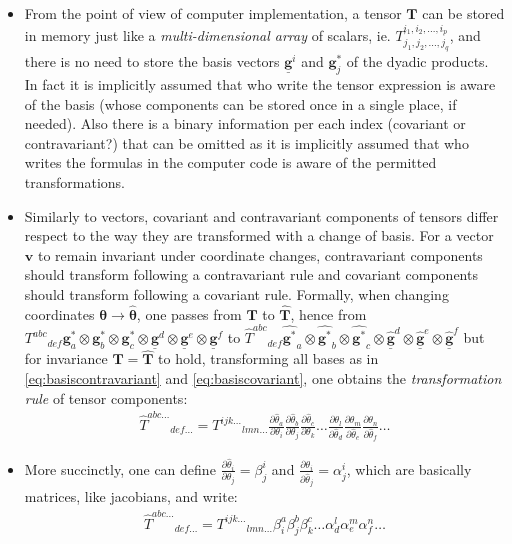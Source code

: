 \documentclass{digitaldynamics}
\def\vect#1{\bm{#1}}
\def\vcovar#1{{\bm{#1}}^*}
\def\vcontr#1{\underline{\bm{#1}}}
\def\tensor#1{\bm{#1}}
\begin{document}
\begin{itemize}
	
	\item From the point of view of computer implementation, a tensor $\tensor{T}$ can be stored in memory just like a \textit{multi-dimensional array} of
	scalars, ie. 	$T^{i_1, i_2, ..., i_p}_{j_1, j_2, ..., j_q}$, and there is no need to store the basis vectors $\vcontr{g}^i$ and $\vcovar{g}_j$ of the dyadic products. 
	In fact it is implicitly assumed that who write the tensor expression is aware of the basis (whose components can be stored once in a single place, if needed).
	Also there is a binary information per each index (covariant or contravariant?) that can be omitted as it is implicitly assumed that
	who writes the formulas in the computer code is aware of the permitted transformations.
 	
	\item Similarly to vectors, covariant and contravariant components of tensors differ respect to the way they are transformed with a change of basis.
	For a vector $\vect{v}$ to remain invariant under coordinate changes, contravariant components should transform following a 
	contravariant rule and covariant components should transform following a covariant rule. Formally, when changing coordinates $\vect{\theta} \rightarrow \hat{\vect{\theta}}$, one passes from $\tensor{T}$ to $\hat{\tensor{T}}$, hence from 
	$T^{abc}{}_{def} \vcovar{g}_a \otimes \vcovar{g}_b \otimes \vcovar{g}_c \otimes \vcontr{g}^d \otimes \vcontr{g}^e \otimes \vcontr{g}^f$ 
	to  
	$\hat{T}^{abc}{}_{def} \hat{\vcovar{g}}_a \otimes \hat{\vcovar{g}}_b \otimes \hat{\vcovar{g}}_c \otimes \hat{\vcontr{g}}^d \otimes \hat{\vcontr{g}}^e \otimes \hat{\vcontr{g}}^f$
	but for invariance $\tensor{T}=\hat{\tensor{T}}$ to hold, transforming all bases as in \eqref{eq:basiscontravariant} and \eqref{eq:basiscovariant}, one obtains the \textit{transformation rule} of tensor components:
	\begin{align}
  \hat{T}^{abc\ldots}{}_{def\ldots} = {T}^{ijk\ldots}{}_{lmn\ldots} 
			\frac{\partial \hat{\theta}_a}{\partial \theta_i}
			\frac{\partial \hat{\theta}_b}{\partial \theta_j}
			\frac{\partial \hat{\theta}_c}{\partial \theta_k}\ldots
			\frac{\partial \theta_l}{\partial \hat{\theta}_d}
			\frac{\partial \theta_m}{\partial \hat{\theta}_e}
			\frac{\partial \theta_n}{\partial \hat{\theta}_f}\ldots
			\label{eq:trasftensor}
	\end{align}
	
	\item More succinctly, one can define $\frac{\partial \hat{\theta}_i}{\partial \theta_j} = \beta^i_j$ and $\frac{\partial \theta_i}{\partial \hat{\theta}_j} = \alpha^i_j$, which are basically matrices, like jacobians, and write:
	\begin{align}
  \hat{T}^{abc\ldots}{}_{def\ldots} = {T}^{ijk\ldots}{}_{lmn\ldots} 
			\beta^a_i \beta^b_j \beta^c_k \ldots
			\alpha^l_d \alpha^m_e \alpha^n_f \ldots
			\label{eq:trasftensorab}
	\end{align}
	

\end{itemize}
\end{document}
